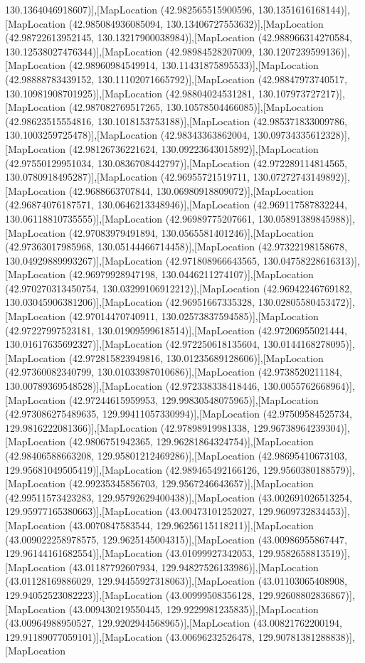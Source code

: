 130.1364046918607)],[MapLocation (42.982565515900596, 130.1351616168144)],[MapLocation (42.985084936085094, 130.13406727553632)],[MapLocation (42.98722613952145, 130.13217900038984)],[MapLocation (42.988966314270584, 130.12538027476344)],[MapLocation (42.98984528207009, 130.1207239599136)],[MapLocation (42.98960984549914, 130.11431875895533)],[MapLocation (42.98888783439152, 130.11102071665792)],[MapLocation (42.98847973740517, 130.10981908701925)],[MapLocation (42.98804024531281, 130.107973727217)],[MapLocation (42.987082769517265, 130.10578504466085)],[MapLocation (42.98623515554816, 130.1018153753188)],[MapLocation (42.985371833009786, 130.1003259725478)],[MapLocation (42.98343363862004, 130.09734335612328)],[MapLocation (42.98126736221624, 130.09223643015892)],[MapLocation (42.97550129951034, 130.0836708442797)],[MapLocation (42.972289114814565, 130.0780918495287)],[MapLocation (42.96955721519711, 130.07272743149892)],[MapLocation (42.9688663707844, 130.06980918809072)],[MapLocation (42.96874076187571, 130.0646213348946)],[MapLocation (42.969117587832244, 130.06118810735555)],[MapLocation (42.96989775207661, 130.05891389845988)],[MapLocation (42.97083979491894, 130.0565581401246)],[MapLocation (42.97363017985968, 130.05144466714458)],[MapLocation (42.97322198158678, 130.04929889993267)],[MapLocation (42.971808966643565, 130.04758228616313)],[MapLocation (42.96979928947198, 130.0446211274107)],[MapLocation (42.970270313450754, 130.03299106912212)],[MapLocation (42.96942246769182, 130.03045906381206)],[MapLocation (42.96951667335328, 130.02805580453472)],[MapLocation (42.97014470740911, 130.02573837594585)],[MapLocation (42.97227997523181, 130.01909599618514)],[MapLocation (42.97206955021444, 130.01617635692327)],[MapLocation (42.972250618135604, 130.0144168278095)],[MapLocation (42.972815823949816, 130.01235689128606)],[MapLocation (42.97360082340799, 130.01033987010686)],[MapLocation (42.9738520211184, 130.00789369548528)],[MapLocation (42.972338338418446, 130.0055762668964)],[MapLocation (42.97244615959953, 129.99830548075965)],[MapLocation (42.973086275489635, 129.99411057330994)],[MapLocation (42.97509584525734, 129.9816222081366)],[MapLocation (42.97898919981338, 129.96738964239304)],[MapLocation (42.9806751942365, 129.96281864324754)],[MapLocation (42.98406588663208, 129.95801212469286)],[MapLocation (42.98695410673103, 129.95681049505419)],[MapLocation (42.989465492166126, 129.9560380188579)],[MapLocation (42.99235345856703, 129.9567246643657)],[MapLocation (42.99511573423283, 129.95792629400438)],[MapLocation (43.002691026513254, 129.95977165380663)],[MapLocation (43.00473101252027, 129.9609732834453)],[MapLocation (43.0070847583544, 129.96256115118211)],[MapLocation (43.009022258978575, 129.9625145004315)],[MapLocation (43.00986955867447, 129.96144161682554)],[MapLocation (43.01099927342053, 129.9582658813519)],[MapLocation (43.01187792607934, 129.94827526133986)],[MapLocation (43.01128169886029, 129.94455927318063)],[MapLocation (43.01103065408908, 129.94052523082223)],[MapLocation (43.00999508356128, 129.92608802836867)],[MapLocation (43.009430219550445, 129.9229981235835)],[MapLocation (43.00964988950527, 129.9202944568965)],[MapLocation (43.00821762200194, 129.91189077059101)],[MapLocation (43.00696232526478, 129.90781381288838)],[MapLocation 